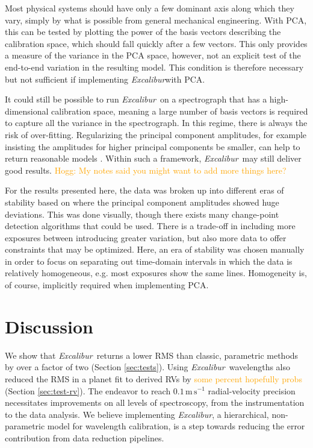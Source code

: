 \documentclass[modern]{aastex63}
\newcommand{\project}[1]{\textsl{#1}}
\newcommand{\name}{\project{Excalibur}}
\newcommand{\lz}[1]{\textcolor{orange}{#1}}
\newcommand{\mps}{\mathrm{m\,s^{-1}}}
\begin{document}
Most physical systems should have only a few dominant axis along which they vary, simply by what is possible from general mechanical engineering.  With PCA, this can be tested by plotting the power of the basis vectors describing the calibration space, which should fall quickly after a few vectors.  This only provides a measure of the variance in the PCA space, however, not an explicit test of the end-to-end variation in the resulting model.  This condition is therefore necessary but not sufficient if implementing \name with PCA.

It could still be possible to run \name\ on a spectrograph that has a high-dimensional calibration space, meaning a large number of basis vectors is required to capture all the variance in the spectrograph.  In this regime, there is always the risk of over-fitting.  Regularizing the principal component amplitudes, for example insisting the amplitudes for higher principal components be smaller, can help to return reasonable models \citep{formanmackey2015} .  Within such a framework, \name\ may still deliver good results.
\lz{Hogg: My notes said you might want to add more things here?}

For the results presented here, the data was broken up into different eras of stability based on where the principal component amplitudes showed huge deviations.  This was done visually, though there exists many change-point detection algorithms that could be used.  There is a trade-off in including more exposures between introducing greater variation, but also more data to offer constraints that may be optimized.  Here, an era of stability was chosen  manually in order to focus on separating out time-domain intervals in which the data is relatively homogeneous, e.g. most exposures show the same lines.  Homogeneity is, of course, implicitly required when implementing PCA.


\section{Discussion} \label{sec:discussion}
We show that \name\ returns a lower RMS than classic, parametric methods by over a factor of two (Section \ref{sec:tests}).  Using \name\ wavelengths also reduced the RMS in a planet fit to derived RVs by \lz{some percent hopefully probs} (Section \ref{sec:test-rv}).  The endeavor to reach $0.1\,\mps$ radial-velocity precision necessitates improvements on all levels of spectroscopy, from the instrumentation to the data analysis.  We believe implementing \name, a hierarchical, non-parametric model for wavelength calibration, is a step towards reducing the error contribution from data reduction pipelines.
\end{document}
